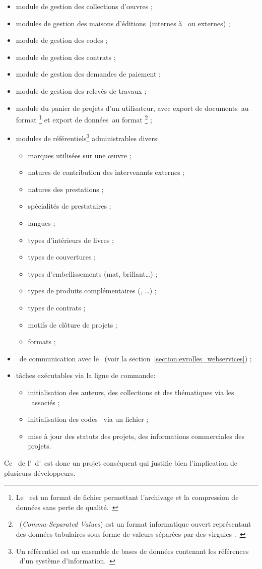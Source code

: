 \begin{itemize}
	\item module de gestion des collections d'œuvres ;
	\item modules de gestion des maisons d'éditions\aast\ (internes à \aey\ ou externes) ;
	\item module de gestion des codes \ageodif\aast ;
	\item module de gestion des contrats ;
	\item module de gestion des demandes de paiement ;
	\item module de gestion des relevés de travaux ;
	\item module du panier de projets d'un utilisateur\aast, avec export de documents\aast\ au format \azip\footnote{Le \azip\ est un format de fichier permettant l'archivage et la compression de données sans perte de qualité.~\cite{zip}} et export de données\aast\ au format \acsv\footnote{\acsv\ (\textit{Comma-Separated Values}) est un format informatique ouvert  représentant des données tabulaires sous forme de \og valeurs séparées par des virgules \fg.~\cite{csv}} ;
	\item modules de référentiels\footnote{Un référentiel est un ensemble de bases de données contenant les \og références \fg\ d'un système d'information.~\cite{referentiel}} administrables divers\aast :
		\begin{itemize}
			\item marques utilisées sur une œuvre ;
			\item natures de contribution des intervenants externes ;
			\item natures des prestations ;
			\item spécialités de prestataires ;
			\item langues ;
			\item types d'intérieurs de livres ;
			\item types de couvertures ;
			\item types d'embellissements (mat, brillant\dots) ;
			\item types de produits complémentaires (\acd, \advd\dots) ;
			\item types de contrats ;
			\item motifs de clôture de projets ;
			\item formats \aebook ;
		\end{itemize}
	\item \awss\ de communication avec le \alotun\aast\ (voir la section~\ref{section:eyrolles_webservices}) ;
	\item tâches exécutables via la ligne de commande\aast :
		\begin{itemize}
			\item initialisation des auteurs, des collections et des thématiques via les \awss\ associés ;
			\item initialisation des codes \ageodif\ via un fichier \acsv ;
			\item mise à jour des statuts des projets, des informations commerciales des projets.
		\end{itemize}
\end{itemize}

Ce \alotdeux\ de l'\aintranet\ d'\aey\ est donc un projet conséquent qui justifie bien l'implication de plusieurs développeurs.
